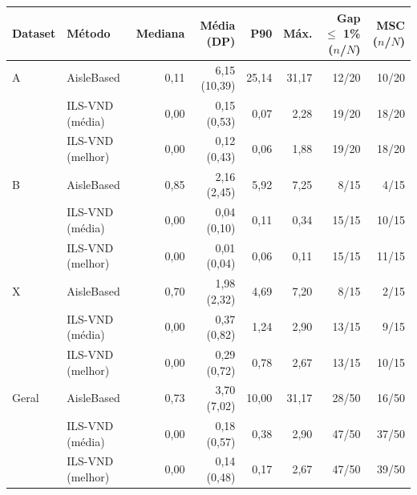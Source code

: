 \small
\begin{tabular}{llrrrrrr}
\toprule
Dataset & Método & Mediana & Média (DP) & P90 & Máx. & Gap $\leq$ 1\% ($n$/$N$) & MSC ($n$/$N$) \\
\midrule
A & AisleBased & 0,11 & 6,15 (10,39) & 25,14 & 31,17 & 12/20 & 10/20 \\
 & ILS-VND (média) & 0,00 & 0,15 (0,53) & 0,07 & 2,28 & 19/20 & 18/20 \\
 & ILS-VND (melhor) & 0,00 & 0,12 (0,43) & 0,06 & 1,88 & 19/20 & 18/20 \\
B & AisleBased & 0,85 & 2,16 (2,45) & 5,92 & 7,25 & 8/15 & 4/15 \\
 & ILS-VND (média) & 0,00 & 0,04 (0,10) & 0,11 & 0,34 & 15/15 & 10/15 \\
 & ILS-VND (melhor) & 0,00 & 0,01 (0,04) & 0,06 & 0,11 & 15/15 & 11/15 \\
X & AisleBased & 0,70 & 1,98 (2,32) & 4,69 & 7,20 & 8/15 & 2/15 \\
 & ILS-VND (média) & 0,00 & 0,37 (0,82) & 1,24 & 2,90 & 13/15 & 9/15 \\
 & ILS-VND (melhor) & 0,00 & 0,29 (0,72) & 0,78 & 2,67 & 13/15 & 10/15 \\
Geral & AisleBased & 0,73 & 3,70 (7,02) & 10,00 & 31,17 & 28/50 & 16/50 \\
 & ILS-VND (média) & 0,00 & 0,18 (0,57) & 0,38 & 2,90 & 47/50 & 37/50 \\
 & ILS-VND (melhor) & 0,00 & 0,14 (0,48) & 0,17 & 2,67 & 47/50 & 39/50 \\
\bottomrule
\end{tabular}

